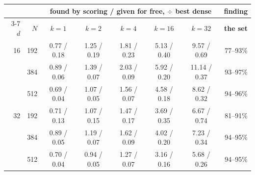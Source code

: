 \begin{tabular}{rr ccccc r}
\toprule
& & \multicolumn{5}{c}{\textbf{found by scoring / given for free}, $\div$ best dense} & \textbf{finding} \\
\cmidrule(lr){3-7}
$d$ & $N$ & $k{=}1$ & $k{=}2$ & $k{=}4$ & $k{=}16$ & $k{=}32$ & \textbf{the set} \\
\midrule
16 & 192 & 0.77 / 0.18 & 1.25 / 0.19 & 1.81 / 0.23 & 5.13 / 0.40 & 9.57 / 0.69 & 77--93\% \\
 & 384 & 0.89 / 0.06 & 1.39 / 0.07 & 2.03 / 0.09 & 5.92 / 0.20 & 11.14 / 0.37 & 93--97\% \\
 & 512 & 0.69 / 0.04 & 1.07 / 0.05 & 1.56 / 0.07 & 4.58 / 0.18 & 8.62 / 0.32 & 94--96\% \\
\midrule
32 & 192 & 0.71 / 0.13 & 1.07 / 0.15 & 1.47 / 0.17 & 3.69 / 0.35 & 6.67 / 0.74 & 81--91\% \\
 & 384 & 0.89 / 0.05 & 1.19 / 0.07 & 1.62 / 0.09 & 4.02 / 0.20 & 7.23 / 0.34 & 94--95\% \\
 & 512 & 0.70 / 0.04 & 0.94 / 0.05 & 1.27 / 0.07 & 3.16 / 0.16 & 5.68 / 0.26 & 94--95\% \\
\bottomrule
\end{tabular}%
